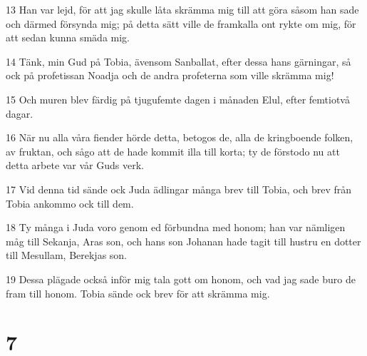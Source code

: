 \par 13 Han var lejd, för att jag skulle låta skrämma mig till att göra såsom han sade och därmed försynda mig; på detta sätt ville de framkalla ont rykte om mig, för att sedan kunna smäda mig.
\par 14 Tänk, min Gud på Tobia, ävensom Sanballat, efter dessa hans gärningar, så ock på profetissan Noadja och de andra profeterna som ville skrämma mig!
\par 15 Och muren blev färdig på tjugufemte dagen i månaden Elul, efter femtiotvå dagar.
\par 16 När nu alla våra fiender hörde detta, betogos de, alla de kringboende folken, av fruktan, och sågo att de hade kommit illa till korta; ty de förstodo nu att detta arbete var vår Guds verk.
\par 17 Vid denna tid sände ock Juda ädlingar många brev till Tobia, och brev från Tobia ankommo ock till dem.
\par 18 Ty många i Juda voro genom ed förbundna med honom; han var nämligen måg till Sekanja, Aras son, och hans son Johanan hade tagit till hustru en dotter till Mesullam, Berekjas son.
\par 19 Dessa plägade också inför mig tala gott om honom, och vad jag sade buro de fram till honom. Tobia sände ock brev för att skrämma mig.

\chapter{7}

